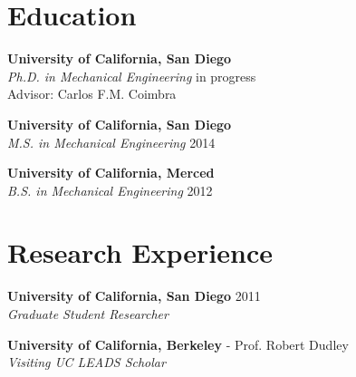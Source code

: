 \documentclass[line]{res}
\begin{document}
\address{9500 Gilman Drive, La Jolla, CA 92093--0411}

\begin{resume}


\section{Education}
\vspace{0.1in}

\textbf{University of California, San Diego} \\
\textit{Ph.D. in Mechanical Engineering} \hfill in progress \\
Advisor: Carlos F.M. Coimbra \\

\vspace{-0.2in}

\textbf{University of California, San Diego} \\
\textit{M.S. in Mechanical Engineering} \hfill 2014 \\

\vspace{-0.2in}

\textbf{University of California, Merced} \\
\textit{B.S. in Mechanical Engineering} \hfill 2012 \\


\section{Research Experience}
\vspace{0.1in}

\textbf{University of California, San Diego} \hfill 2011 \\
\textit{Graduate Student Researcher} \\

\vspace{-0.2in}

\textbf{University of California, Berkeley} - Prof. Robert Dudley \\
\textit{Visiting UC LEADS Scholar} \\



\end{resume}
\end{document}
